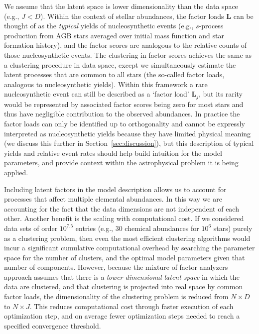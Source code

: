 \documentclass[twocolumn]{aastex62}
\newcommand{\factorloads}{\textbf{L}}
\newcommand{\NumDimensions}{D}
\newcommand{\NumLatentFactors}{J}
\newcommand{\numlatentfactors}{j}
\begin{document}
We assume that the latent space is lower dimensionality than the
data space (e.g., $\NumLatentFactors < \NumDimensions$).
Within the context of stellar abundances, the factor loads
$\factorloads$ can be thought of as the \emph{typical} yields
of nucleosynthetic
events (e.g., $s$-process production from AGB stars averaged over
initial mass function and star formation history), and the
factor scores are analogous to the relative counts of those 
nucleosynthetic events. The clustering in factor scores
achieves the same as a clustering procedure in data space,
except we simultaneously estimate the latent processes that are
common to all stars (the so-called factor loads, analogous to 
nucleosynthetic yields). Within this framework a rare nucleosynthetic event
can still be described as a `factor load' $\factorloads_\numlatentfactors$, 
but its rarity would be represented by associated factor
scores being zero for most stars and thus have negligible contribution
to the observed abundances. In practice the factor loads can only be 
identified up to orthogonality and cannot be expressly interpreted as
nucleosynthetic yields because they have limited physical meaning
(we discuss this further in Section~\ref{sec:discussion}),
but this description of typical yields and relative event rates should
help build intuition for the model parameters, and provide context
within the astrophysical problem it is being applied.


Including latent factors in the model description allows us to account for 
processes that affect multiple elemental abundances. In this way we are 
accounting for the fact that the data dimensions are not independent of
each other. Another benefit is the scaling with computational cost. If we 
considered data sets of order $10^{7.5}$
entries (e.g., 30 chemical abundances for $10^6$ stars) purely as a
clustering problem, then even the most efficient clustering
algorithms would incur a significant cumulative computational 
overhead by searching the parameter space for the number of
clusters, and the optimal model parameters given that number
of components. However, because the mixture of factor analyzers
approach assumes that there is a \emph{lower dimensional latent 
space} in which the data are clustered, and that clustering is 
projected into real space by common factor loads, the 
dimensionality of the clustering problem is reduced from 
$N \times D$ to $N \times J$. This reduces computational cost through
faster execution of each optimization step, and on average fewer optimization steps
needed to reach a specified convergence threshold.
\end{document}
